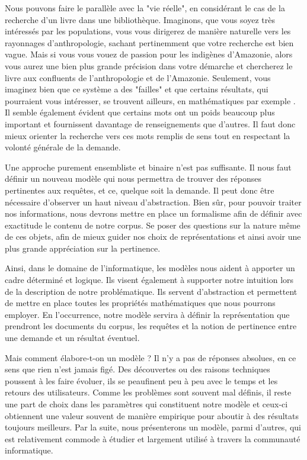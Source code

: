 Nous pouvons faire le parallèle avec la "vie réelle", en considérant le cas de la recherche d'un livre dans une bibliothèque. Imaginons, que vous soyez très intéressés par les populations, vous vous dirigerez de manière naturelle vers les rayonnages d'anthropologie, sachant pertinemment que votre recherche est bien vague. Mais si vous vous vouez de passion pour les indigènes d'Amazonie, alors vous aurez une bien plus grande précision dans votre démarche et chercherez le livre aux confluents de l'anthropologie et de l'Amazonie. Seulement, vous imaginez bien que ce système a des "failles" et que certains résultats, qui pourraient vous intéresser, se trouvent ailleurs, en mathématiques par exemple \cite{levi1949structures}. Il semble également évident que certains mots ont un poids beaucoup plus important et fournissent davantage de renseignements que d'autres. Il faut donc mieux orienter la recherche vers ces mots remplis de sens tout en respectant la volonté générale de la demande.

Une approche purement ensembliste et binaire n'est pas suffisante. Il nous faut définir un nouveau modèle qui nous permettra de trouver des réponses pertinentes aux requêtes, et ce, quelque soit la demande. Il peut donc être nécessaire d'observer un haut niveau d'abstraction. Bien sûr, pour pouvoir traiter nos informations, nous devrons mettre en place un formalisme afin de définir avec exactitude le contenu de notre corpus. Se poser des questions sur la nature même de ces objets, afin de mieux guider nos choix de représentations et ainsi avoir une plus grande appréciation sur la pertinence.

Ainsi, dans le domaine de l'informatique, les modèles nous aident à apporter un cadre déterminé et logique. Ils visent également à supporter notre intuition lors de la description de notre problématique. Ils servent d'abstraction et permettent de mettre en place toutes les propriétés mathématiques que nous pourrons employer. En l'occurrence, notre modèle servira à définir la représentation que prendront les documents du corpus, les requêtes et la notion de pertinence entre une demande et un résultat éventuel.

Mais comment élabore-t-on un modèle ? Il n'y a pas de réponses absolues, en ce sens que rien n'est jamais figé. Des découvertes ou des raisons techniques poussent à les faire évoluer, ils se peaufinent peu à peu avec le temps et les retours des utilisateurs. Comme les problèmes sont souvent mal définis, il reste une part de choix dans les paramètres qui constituent notre modèle et ceux-ci obtiennent une valeur souvent de manière empirique pour aboutir à des résultats toujours meilleurs. Par la suite, nous présenterons un modèle, parmi d'autres, qui est relativement commode à étudier et largement utilisé à travers la communauté informatique.

